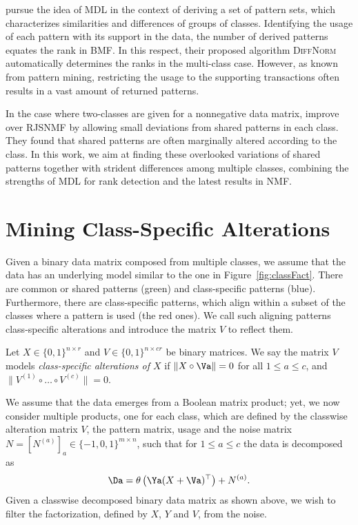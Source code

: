 \cite{vreeken2007characterising} pursue the idea of MDL in the context of deriving a set of pattern sets, which characterizes similarities and differences of groups of classes. Identifying the usage of each pattern with its support in the data, the number of derived patterns equates the rank in BMF. In this respect, their proposed algorithm \textsc{DiffNorm} automatically determines the ranks in the multi-class case. However, as known from pattern mining, restricting the usage to the supporting transactions often results in a vast amount of returned patterns.    

In the case where two-classes are given for a nonnegative data matrix, \cite{kim2015simultaneous} improve over RJSNMF by allowing small deviations from shared patterns in each class. They found that shared patterns are often marginally altered according to the class. In this work, we aim at finding these overlooked variations of shared patterns together with strident differences among multiple classes, combining the strengths of MDL for rank detection and the latest results in NMF.
\section{Mining Class-Specific Alterations}
Given a binary data matrix composed from multiple classes, we assume that the data has an underlying model similar to the one in Figure~\ref{fig:classFact}. There are common or shared patterns (green) and class-specific patterns (blue). Furthermore, there are class-specific patterns, which align within a subset of the classes where a pattern is used (the red ones). We call such aligning patterns class-specific alterations and introduce the matrix $V$ to reflect them.
\begin{definition}\label{def:CS:classSpecAlt}
Let $X\in\{0,1\}^{n\times r}$ and $V\in \{0,1\}^{n\times cr}$ be binary matrices.
We say the matrix $V$ models \emph{class-specific alterations of $X$} if $\|X\circ \Va\|=0$ for all $1\leq a\leq c$, and $\|V^{(1)}\circ\ldots\circ V^{(c)}\|=0$.
\end{definition}
We assume that the data emerges from a Boolean matrix product; yet, we now consider multiple products, one for each class, which are defined by the classwise alteration matrix $V$, the pattern matrix, usage and the noise matrix $N=[N^{(a)}]_a\in\{-1,0,1\}^{m\times n}$, such that for $1\leq a\leq c$ the data is decomposed as
\begin{align}\label{eq:CS:VBMF}
\Da= \theta\left(\Ya(X+\Va)^\top \right) +N^{(a)}.
\end{align}
Given a classwise decomposed binary data matrix as shown above, we wish to filter the factorization, defined by $X$, $Y$ and $V$, from the noise.
